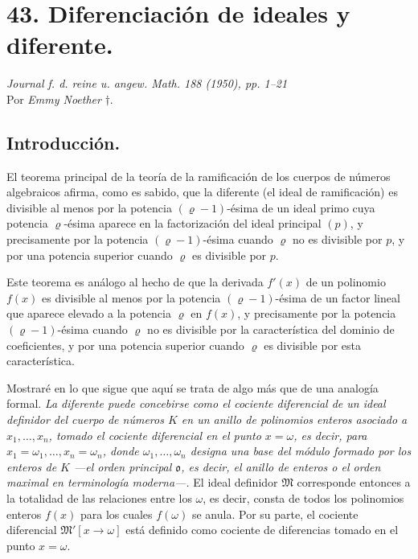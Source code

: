 \section*{43. Diferenciación de ideales y diferente.}

\begin{center}
\emph{Journal f. d. reine u. angew. Math. 188 (1950), pp. 1--21}\\[0.75ex]
Por \emph{Emmy Noether} \(\dagger\).
\end{center}


\subsection*{Introducción.}

El teorema principal de la teoría de la ramificación de los cuerpos de números algebraicos afirma, como es sabido, que la diferente (el ideal de ramificación) es divisible al menos por la potencia $(\varrho-1)$-ésima de un ideal primo cuya potencia $\varrho$-ésima aparece en la factorización del ideal principal $(p)$, y precisamente por la potencia $(\varrho-1)$-ésima cuando $\varrho$ no es divisible por $p$, y por una potencia superior cuando $\varrho$ es divisible por $p$.

Este teorema es análogo al hecho de que la derivada $f'(x)$ de un polinomio $f(x)$ es divisible al menos por la potencia $(\varrho-1)$-ésima de un factor lineal que aparece elevado a la potencia $\varrho$ en $f(x)$, y precisamente por la potencia $(\varrho-1)$-ésima cuando $\varrho$ no es divisible por la característica del dominio de coeficientes, y por una potencia superior cuando $\varrho$ es divisible por esta característica.

Mostraré en lo que sigue que aquí se trata de algo más que de una analogía formal. \emph{La diferente puede concebirse como el cociente diferencial de un ideal definidor del cuerpo de números $K$ en un anillo de polinomios enteros asociado a $x_1,\ldots,x_n$, tomado el cociente diferencial en el punto $x=\omega$, es decir, para $x_1=\omega_1,\ldots,x_n=\omega_n$, donde $\omega_1,\ldots,\omega_n$ designa una base del módulo formado por los enteros de $K$ ---el orden principal $\mathfrak o$, es decir, el anillo de enteros o el orden maximal en terminología moderna---.} El ideal definidor $\mathfrak M$ corresponde entonces a la totalidad de las relaciones entre los $\omega$, es decir, consta de todos los polinomios enteros $f(x)$ para los cuales $f(\omega)$ se anula. Por su parte, el cociente diferencial $\mathfrak M'[x\to\omega]$ está definido como cociente de diferencias tomado en el punto $x=\omega$.

